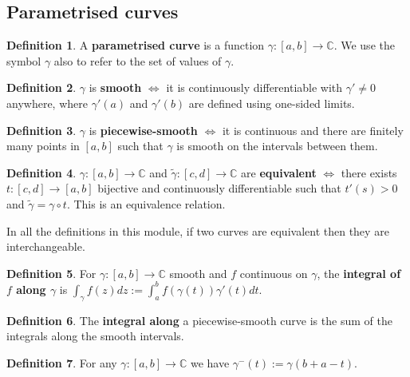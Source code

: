 \documentclass[12pt]{article}
\theoremstyle{definition}
\newtheorem{defn}{Definition}[section]
\newcommand{\C}{\mathbb{C}}
\begin{document}

\subsection{Parametrised curves}

\begin{defn}
  A \textbf{parametrised curve} is a function $\gamma : [a, b] \to \C$.
  We use the symbol $\gamma$ also to refer to the set of values of $\gamma$.
\end{defn}

\begin{defn}
  $\gamma$ is \textbf{smooth} $\iff$ it is continuously differentiable with $\gamma' \neq 0$ anywhere, where $\gamma'(a)$ and $\gamma'(b)$ are defined using one-sided limits.
\end{defn}

\begin{defn}
  $\gamma$ is \textbf{piecewise-smooth} $\iff$ it is continuous and there are finitely many points in $[a, b]$ such that $\gamma$ is smooth on the intervals between them.
\end{defn}

\begin{defn}
  $\gamma : [a, b] \to \C$ and $\tilde{\gamma} : [c, d] \to \C$ are \textbf{equivalent} $\iff$ there exists $t : [c, d] \to [a, b]$ bijective and continuously differentiable such that $t'(s) > 0$ and $\tilde{\gamma} = \gamma \circ t$.
  This is an equivalence relation.
\end{defn}

\noindent In all the definitions in this module, if two curves are equivalent then they are interchangeable.

\begin{defn}
  For $\gamma : [a, b] \to \C$ smooth and $f$ continuous on $\gamma$, the \textbf{integral of $f$ along $\gamma$} is $\int_{\gamma}f(z)dz := \int_a^bf(\gamma(t))\gamma'(t)dt$.
\end{defn}

\begin{defn}
  The \textbf{integral along} a piecewise-smooth curve is the sum of the integrals along the smooth intervals.
\end{defn}

\begin{defn}
  For any $\gamma : [a, b] \to \C$ we have $\gamma^-(t) := \gamma(b + a - t)$.
\end{defn}
\end{document}
